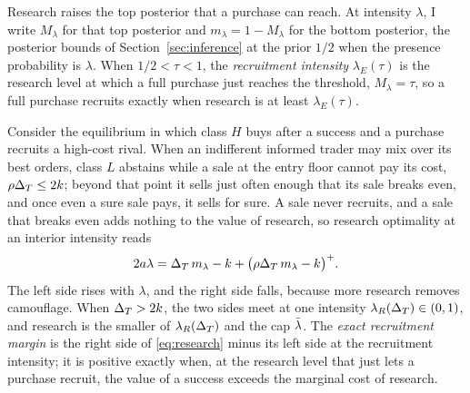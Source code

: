 Research raises the top posterior that a purchase can reach. At intensity \(\lambda\), I write \(M_\lambda\) for that
top posterior and \(m_\lambda=1-M_\lambda\) for the bottom posterior, the posterior bounds of
Section~\ref{sec:inference} at the prior \(1/2\) when the presence probability is \(\lambda\). When \(1/2<\tau<1\),
the \emph{recruitment intensity} \(\lambda_E(\tau)\) is the research level at which a full purchase just reaches the
threshold, \(M_\lambda=\tau\), so a full purchase recruits exactly when research is at least \(\lambda_E(\tau)\).

Consider the equilibrium in which class \(H\) buys after a success and a purchase recruits a high-cost rival.
When an indifferent informed trader may mix over its best orders, class \(L\) abstains while a sale at the entry floor
cannot pay its cost, \(\rho\Delta_T\le2k\); beyond that point it sells just often enough that its sale breaks even, and
once even a sure sale pays, it sells for sure. A sale never recruits, and a sale that breaks even adds nothing to the
value of research, so research optimality at an interior intensity reads
\begin{equation}\label{eq:research}
2a\lambda=\Delta_T\,m_\lambda-k+\bigl(\rho\Delta_T\,m_\lambda-k\bigr)^+ .
\end{equation}
The left side rises with \(\lambda\), and the right side falls, because more research removes camouflage. When
\(\Delta_T>2k\), the two sides meet at one intensity \(\lambda_R(\Delta_T)\in(0,1)\), and research is the smaller of
\(\lambda_R(\Delta_T)\) and the cap \(\bar\lambda\). The \emph{exact recruitment margin} is the right side of \eqref{eq:research}
minus its left side at the recruitment intensity; it is positive exactly when, at the research level that just lets a
purchase recruit, the value of a success exceeds the marginal cost of research.

